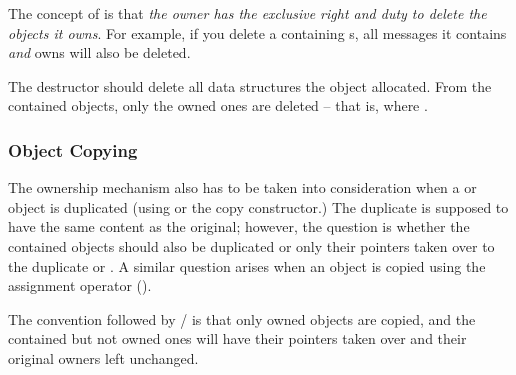 The concept of  is that \textit{the owner has the
exclusive right and duty to delete the objects it owns}.
For example, if you delete a  containing s,
all messages it contains \textit{and} owns will also be deleted.

The destructor should delete all data structures the object allocated.
From the contained objects, only the owned ones are deleted -- that is,
where .


\subsubsection{Object Copying}
\label{sec:sim-lib:ownership-and-object-copying}

The ownership mechanism also has to be taken into consideration
when a  or  object is duplicated
(using  or the copy constructor.)
The duplicate is supposed to have the same content as the
original; however, the question is whether the contained objects
should also be duplicated or only their pointers taken over
to the duplicate  or . A similar
question arises when an object is copied using the assignment operator
().

The convention followed by / is that
only owned objects are copied, and the contained but not owned ones
will have their pointers taken over and their original owners
left unchanged.


%
%
%
%
%
%
%


